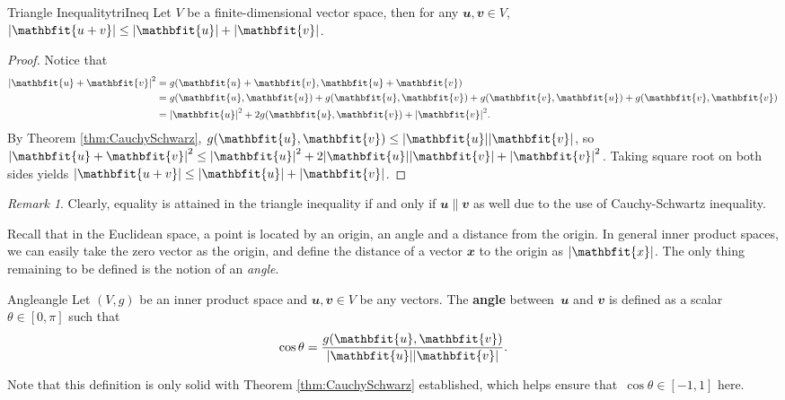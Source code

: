\documentclass[math]{amznotes}
\theoremstyle{remark}
\newtheorem*{remark}{Remark}
\begin{document}
\begin{corbox}{Triangle Inequality}{triIneq}
    Let $V$ be a finite-dimensional vector space, then for any $\mathbfit{u}, \mathbfit{v} \in V$, $\abs{\mathbfit{u + v}} \leq \abs{\mathbfit{u}} + \abs{\mathbfit{v}}$. 
    \tcblower
    \begin{proof}
        Notice that 
        \begin{align*}
            \abs{\mathbfit{u} + \mathbfit{v}}^2 & = g(\mathbfit{u} + \mathbfit{v}, \mathbfit{u} + \mathbfit{v}) \\
            & = g(\mathbfit{u}, \mathbfit{u}) + g(\mathbfit{u}, \mathbfit{v}) + g(\mathbfit{v}, \mathbfit{u}) + g(\mathbfit{v}, \mathbfit{v}) \\
            & = \abs{\mathbfit{u}}^2 + 2g(\mathbfit{u}, \mathbfit{v}) + \abs{\mathbfit{v}}^2.
        \end{align*}
        By Theorem \ref{thm:CauchySchwarz}, $g(\mathbfit{u}, \mathbfit{v}) \leq \abs{\mathbfit{u}}\abs{\mathbfit{v}}$, so $\abs{\mathbfit{u} + \mathbfit{v}}^2 \leq \abs{\mathbfit{u}}^2 + 2\abs{\mathbfit{u}}\abs{\mathbfit{v}} + \abs{\mathbfit{v}}^2$. Taking square root on both sides yields $\abs{\mathbfit{u + v}} \leq \abs{\mathbfit{u}} + \abs{\mathbfit{v}}$.
    \end{proof}
\end{corbox}
\begin{notebox}
    \begin{remark}
        Clearly, equality is attained in the triangle inequality if and only if $\mathbfit{u} \parallel \mathbfit{v}$ as well due to the use of Cauchy-Schwartz inequality.
    \end{remark}
\end{notebox}

Recall that in the Euclidean space, a point is located by an origin, an angle and a distance from the origin. In general inner product spaces, we can easily take the zero vector as the origin, and define the distance of a vector $\mathbfit{x}$ to the origin as $\abs{\mathbfit{x}}$. The only thing remaining to be defined is the notion of an \textit{angle}.
\begin{dfnbox}{Angle}{angle}
    Let $(V, g)$ be an inner product space and $\mathbfit{u}, \mathbfit{v} \in V$ be any vectors. The {\color{red} \textbf{angle}} between~$\mathbfit{u}$ and $\mathbfit{v}$ is defined as a scalar $\theta \in [0, \pi]$ such that 
    \begin{equation*}
        \cos\theta = \frac{g(\mathbfit{u}, \mathbfit{v})}{\abs{\mathbfit{u}}\abs{\mathbfit{v}}}.
    \end{equation*}
\end{dfnbox}
Note that this definition is only solid with Theorem \ref{thm:CauchySchwarz} established, which helps ensure that~$\cos\theta \in [-1, 1]$ here.
\end{document}
